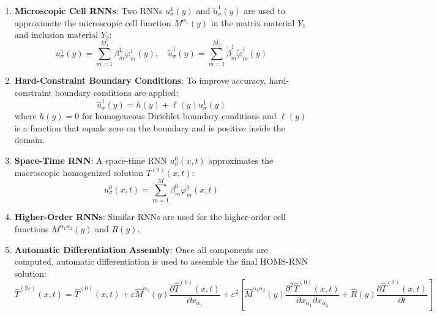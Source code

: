 \documentclass[11pt]{article}
\begin{document}
\begin{enumerate}
    \item \textbf{Microscopic Cell RNNs}: Two RNNs $u^1_\sigma(y)$ and $\tilde{u}^1_\sigma(y)$ are used to approximate the microscopic cell function $M^{\alpha_1}(y)$ in the matrix material $Y_1$ and inclusion material $Y_2$:
    \begin{equation}
    u^1_\sigma(y) = \sum_{m=1}^{M_1} \beta^1_m \varphi^1_m(y), \quad \tilde{u}^1_\sigma(y) = \sum_{m=1}^{M_2} \tilde{\beta}^1_m \tilde{\varphi}^1_m(y)
    \end{equation}
    
    \item \textbf{Hard-Constraint Boundary Conditions}: To improve accuracy, hard-constraint boundary conditions are applied:
    \begin{equation}
    \hat{u}^1_\sigma(y) = h(y) + \ell(y)u^1_\sigma(y)
    \end{equation}
    where $h(y) = 0$ for homogeneous Dirichlet boundary conditions and $\ell(y)$ is a function that equals zero on the boundary and is positive inside the domain.
    
    \item \textbf{Space-Time RNN}: A space-time RNN $u^0_\sigma(x,t)$ approximates the macroscopic homogenized solution $T^{(0)}(x,t)$:
    \begin{equation}
    u^0_\sigma(x,t) = \sum_{m=1}^{M} \beta^0_m \varphi^0_m(x,t)
    \end{equation}
    
    \item \textbf{Higher-Order RNNs}: Similar RNNs are used for the higher-order cell functions $M^{\alpha_1\alpha_2}(y)$ and $R(y)$.
    
    \item \textbf{Automatic Differentiation Assembly}: Once all components are computed, automatic differentiation is used to assemble the final HOMS-RNN solution:
    \begin{equation}
    \hat{T}^{(2\varepsilon)}(x,t) = \hat{T}^{(0)}(x,t) + \varepsilon \hat{M}^{\alpha_1}(y)\frac{\partial \hat{T}^{(0)}(x,t)}{\partial x_{\alpha_1}} + \varepsilon^2\left[\hat{M}^{\alpha_1\alpha_2}(y)\frac{\partial^2 \hat{T}^{(0)}(x,t)}{\partial x_{\alpha_1}\partial x_{\alpha_2}} + \hat{R}(y)\frac{\partial \hat{T}^{(0)}(x,t)}{\partial t}\right]
    \end{equation}
\end{enumerate}
\end{document}
